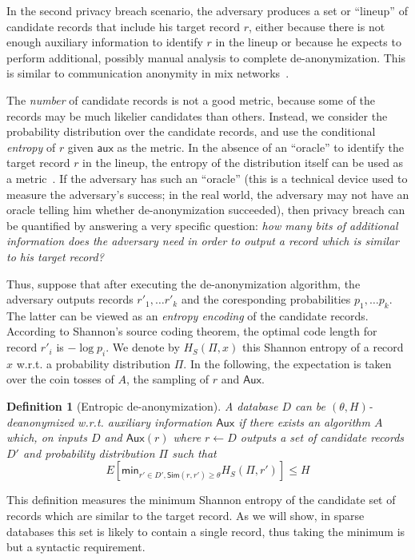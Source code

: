 \documentclass[11pt]{article}
\newcommand{\Sim}{\textsf{Sim}}
\newcommand{\Aux}{\textsf{Aux}}
\newcommand{\aux}{\textsf{aux}}
\newtheorem{definition}{Definition}
\begin{document}
In the second privacy breach scenario, the adversary produces a set or
``lineup'' of candidate records that include his target record $r$,
either because there is not enough auxiliary information to identify $r$
in the lineup or because he expects to perform additional, possibly
manual analysis to complete de-anonymization.   This is similar to
communication anonymity in mix networks~\cite{SD02}.

The \emph{number} of candidate records is not a good metric, because some
of the records may be much likelier candidates than others.  Instead,
we consider the probability distribution over the candidate records, and
use the conditional \emph{entropy} of $r$ given $\aux$ as the metric.
In the absence of an ``oracle'' to identify the target record $r$
in the lineup, the entropy of the distribution itself can be used as
a metric~\cite{SD02,DSCP02}.  If the adversary has such an ``oracle''
(this is a technical device used to measure the adversary's success; in
the real world, the adversary may not have an oracle telling him whether
de-anonymization succeeded), then privacy breach can be quantified by
answering a very specific question: \emph{how many bits of additional
information does the adversary need in order to output a record which
is similar to his target record?}

Thus, suppose that after executing the de-anonymization algorithm,
the adversary outputs records $r'_1, \ldots r'_k$ and the coresponding
probabilities $p_1, \ldots p_k$.  The latter can be viewed as an
\emph{entropy encoding} of the candidate records.  According to Shannon's
source coding theorem, the optimal code length for record $r'_i$
is $-\log p_i$.  We denote by $H_S(\Pi,x)$ this Shannon entropy of a
record $x$ w.r.t. a probability distribution $\Pi$.  In the following,
the expectation is taken over the coin tosses of $A$, the sampling of $r$
and $\Aux$.

\begin{definition}
[Entropic de-anonymization]
\label{def:ane}
A database $D$ can be $(\theta, H)$-deanonymized w.r.t. auxiliary
information $\Aux$ if there exists an algorithm $A$ which, on inputs $D$
and $\Aux(r)$ where $r \leftarrow D$ outputs a set of candidate records
$D'$ and probability distribution $\Pi$ such that
$$
E[\textsf{min}_{r' \in D', \Sim(r, r') \geq \theta}H_S(\Pi, r')] \leq H
$$
\end{definition}

This definition measures the minimum Shannon entropy of the candidate
set of records which are similar to the target record.  As we will show,
in sparse databases this set is likely to contain a single record,
thus taking the minimum is but a syntactic requirement.
\end{document}
